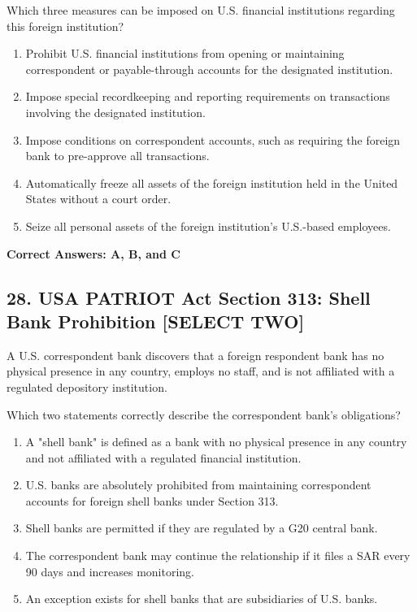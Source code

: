 \documentclass[11pt,a4paper]{article}
\begin{document}
	Which three measures can be imposed on U.S. financial institutions regarding this foreign institution?
	
	\begin{enumerate}[label=\Alph*.]
		\item Prohibit U.S. financial institutions from opening or maintaining correspondent or payable-through accounts for the designated institution.
		\item Impose special recordkeeping and reporting requirements on transactions involving the designated institution.
		\item Impose conditions on correspondent accounts, such as requiring the foreign bank to pre-approve all transactions.
		\item Automatically freeze all assets of the foreign institution held in the United States without a court order.
		\item Seize all personal assets of the foreign institution's U.S.-based employees.
	\end{enumerate}
	
	\textbf{Correct Answers: A, B, and C}
	
	\subsection{28. USA PATRIOT Act Section 313: Shell Bank Prohibition \textnormal{[SELECT TWO]}}
	
	A U.S. correspondent bank discovers that a foreign respondent bank has no physical presence in any country, employs no staff, and is not affiliated with a regulated depository institution.
	
	Which two statements correctly describe the correspondent bank's obligations?
	
	\begin{enumerate}[label=\Alph*.]
		\item A "shell bank" is defined as a bank with no physical presence in any country and not affiliated with a regulated financial institution.
		\item U.S. banks are absolutely prohibited from maintaining correspondent accounts for foreign shell banks under Section 313.
		\item Shell banks are permitted if they are regulated by a G20 central bank.
		\item The correspondent bank may continue the relationship if it files a SAR every 90 days and increases monitoring.
		\item An exception exists for shell banks that are subsidiaries of U.S. banks.
	\end{enumerate}
	
\end{document}
